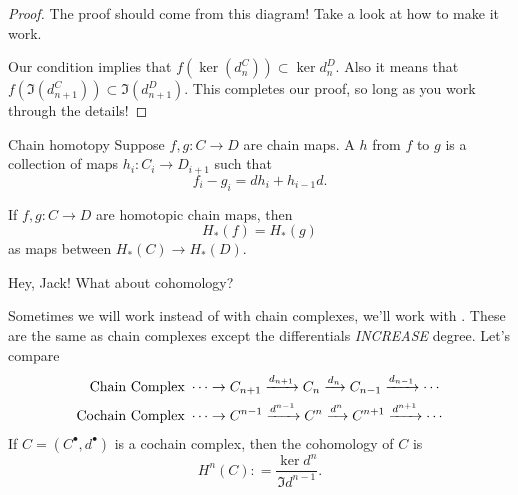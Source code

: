 \begin{proof}The proof should come from this diagram! Take a look at how to make  it work. 
    \begin{center}
    \end{center}
    Our condition implies that $f(\ker(d_n^C))\subset \ker d_n^D$. Also it means that $f(\Im(d_{n+1}^C))\subset \Im(d_{n+1}^D)$. This completes our proof, so long as you work through the details!
\end{proof}

\begin{definition}{Chain homotopy}{}
    Suppose $f,g:C\to D$ are chain maps. A  $h$ from $f$ to $g$ is a collection of maps $h_i:C_i\to D_{i+1}$ such that $$f_i - g_i = d h_i + h_{i-1} d.$$
\end{definition}

\begin{fact}{}{}
    If $f,g:C\to D$ are homotopic chain maps, then $$H_\ast(f) = H_\ast(g)$$ as maps between $H_\ast(C)\to H_\ast(D)$. 

\end{fact}

Hey, Jack! What about cohomology?

\begin{remark}{}{}
    Sometimes we will work instead of with chain complexes, we'll work with . These are the same as chain complexes except the differentials \emph{INCREASE} degree. Let's compare
    \begin{align*}
        \text{Chain Complex }& \cdots \to C_{n+1}\xrightarrow{d_{n+1}}C_n\xrightarrow{d_n}C_{n-1}\xrightarrow{d_{n-1}}\cdots\\
        \text{Cochain Complex }& \cdots \to C^{n-1}\xrightarrow{d^{n-1}}C^n\xrightarrow{d^n}C^{n+1}\xrightarrow{d^{n+1}}\cdots\\
    \end{align*}
    If $C = (C^\bullet, d^\bullet)$ is a cochain complex, then the cohomology of $C$ is $$H^n(C): = \frac{\ker d^n}{\Im d^{n-1}}.$$
\end{remark}

